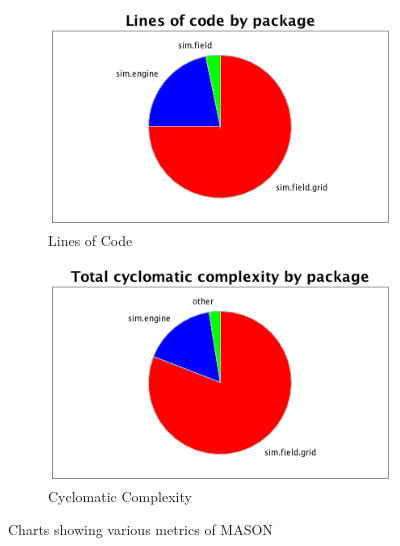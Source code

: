 \documentclass[11pt]{article}
\begin{document}
\begin{figure}
\begin{subfigure}[b]{0.5\textwidth}
\includegraphics[width=\textwidth]{Appendix/LOC}
\caption{Lines of Code}
\label{fig:loc}
\end{subfigure}
\begin{subfigure}[b]{0.5\textwidth}
\includegraphics[width=\textwidth]{Appendix/Cyclomatic}
\caption{Cyclomatic Complexity}
\label{fig:cc}
\end{subfigure}

\caption{Charts showing various metrics of MASON}
\label{fig:metric_charts}
\end{figure}


\end{document}
